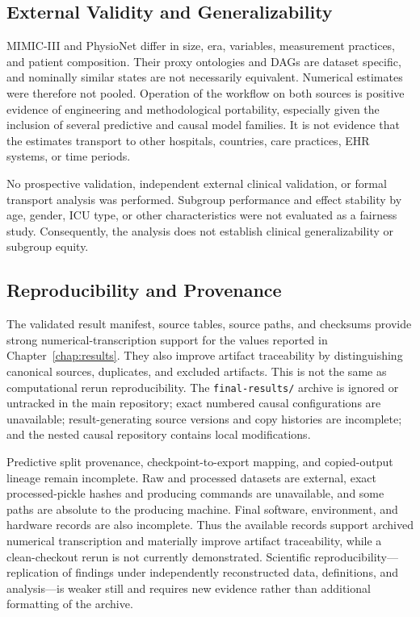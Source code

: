 \subsection{External Validity and Generalizability}
\label{subsec:discussion:external-validity}

MIMIC-III and PhysioNet differ in size, era, variables, measurement practices, and patient composition.  Their proxy ontologies and DAGs are dataset specific, and nominally similar states are not necessarily equivalent.  Numerical estimates were therefore not pooled.  Operation of the workflow on both sources is positive evidence of engineering and methodological portability, especially given the inclusion of several predictive and causal model families.  It is not evidence that the estimates transport to other hospitals, countries, care practices, EHR systems, or time periods.

No prospective validation, independent external clinical validation, or formal transport analysis was performed.  Subgroup performance and effect stability by age, gender, ICU type, or other characteristics were not evaluated as a fairness study.  Consequently, the analysis does not establish clinical generalizability or subgroup equity.

\subsection{Reproducibility and Provenance}
\label{subsec:discussion:reproducibility-provenance}

The validated result manifest, source tables, source paths, and checksums provide strong numerical-transcription support for the values reported in Chapter~\ref{chap:results}.  They also improve artifact traceability by distinguishing canonical sources, duplicates, and excluded artifacts.  This is not the same as computational rerun reproducibility.  The \texttt{final-results/} archive is ignored or untracked in the main repository; exact numbered causal configurations are unavailable; result-generating source versions and copy histories are incomplete; and the nested causal repository contains local modifications.

Predictive split provenance, checkpoint-to-export mapping, and copied-output lineage remain incomplete.  Raw and processed datasets are external, exact processed-pickle hashes and producing commands are unavailable, and some paths are absolute to the producing machine.  Final software, environment, and hardware records are also incomplete.  Thus the available records support archived numerical transcription and materially improve artifact traceability, while a clean-checkout rerun is not currently demonstrated.  Scientific reproducibility---replication of findings under independently reconstructed data, definitions, and analysis---is weaker still and requires new evidence rather than additional formatting of the archive.


